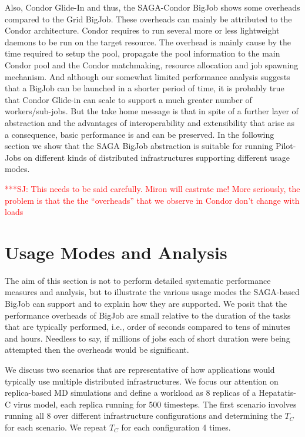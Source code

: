 \documentclass[conference,final]{IEEEtran}
\newcommand{\up}{\vspace*{-1em}}
\newcommand{\numrep}{8 }
\newcommand{\samplenum}{4 }
\newcommand{\tc}{$T_{C}$ }
\newcommand{\jhanote}[1]{ {\textcolor{red} { ***SJ: #1 }}}
\newcommand{\jhanote}[1]{}
\begin{document}
Also, Condor Glide-In and thus, the SAGA-Condor BigJob shows some
overheads compared to the Grid BigJob. These overheads can mainly be
attributed to the Condor architecture. Condor requires to run several
more or less lightweight daemons to be run on the target resource. The
overhead is mainly cause by the time required to setup the pool,
propagate the pool information to the main Condor pool and the Condor
matchmaking, resource allocation and job spawning mechanism. And
although our somewhat limited performance analysis suggests that a
BigJob can be launched in a shorter period of time, it is probably true
that Condor Glide-in can scale to support a much greater number of
workers/sub-jobs. But the take home message is that in spite of a
further layer of abstraction and the advantages of interoperability
and extensibility that arise as a consequence, basic performance is
and can be preserved.  In the following section we show that the SAGA
BigJob abstraction is suitable for running Pilot-Jobs on different
kinds of distributed infrastructures supporting different usage modes.

\jhanote{This needs to be said carefully. Miron will castrate me! More
  seriously, the problem is that the the ``overheads'' that we observe
  in Condor don't change with loads}

\up
\section{Usage Modes and Analysis}
\up

The aim of this section is not to perform detailed systematic
performance measures and analysis, but to illustrate the various usage
modes the SAGA-based BigJob can support and to explain how they are supported. We
posit that the performance overheads of BigJob are small relative to
the duration of the tasks that are typically performed, i.e., order of
seconds compared to tens of minutes and hours.  Needless to say, if
millions of jobs each of short duration were being attempted then the
overheads would be significant.

We discuss two scenarios that are representative of how applications
would typically use multiple distributed infrastructures. We focus our
attention on replica-based MD simulations and define a workload as
\numrep replicas of a Hepatatis-C virus model, each replica running for
500 timesteps.  The first scenario involves running all \numrep over
different infrastructure configurations and determining the \tc for
each scenario. We repeat \tc for each configuration \samplenum times.
\end{document}
